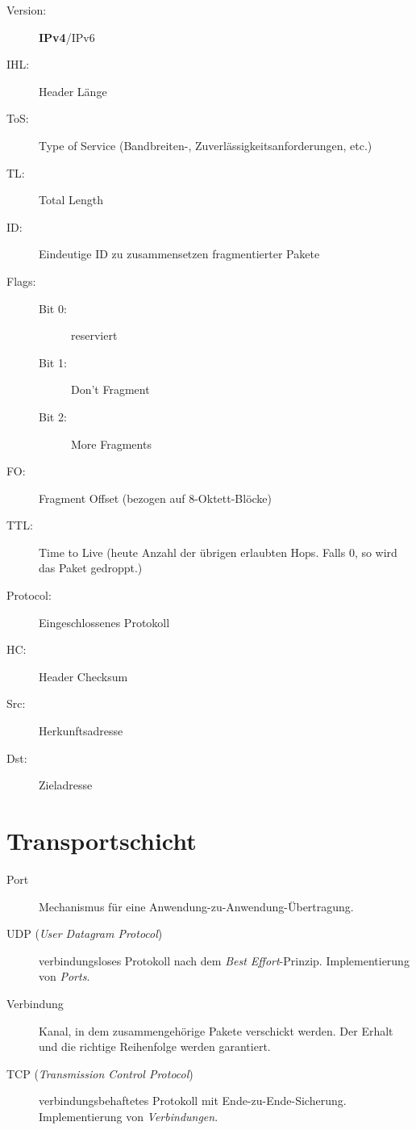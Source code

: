 \documentclass[a4paper]{article}
\begin{document}
\vspace{5mm}
\begin{minipage}{0.45\textwidth}
    \begin{description}
        \item[Version:] \textbf{IPv4}/IPv6
        \item[IHL:] Header Länge
        \item[ToS:] Type of Service (Bandbreiten-, Zuverlässigkeitsanforderungen, etc.)
        \item[TL:] Total Length
        \item[ID:] Eindeutige ID zu zusammensetzen fragmentierter Pakete
        \item[Flags:]\hfill
        \begin{description}
            \item[Bit 0:] reserviert
            \item[Bit 1:] Don't Fragment
            \item[Bit 2:] More Fragments
        \end{description}
    \end{description}
\end{minipage}
\begin{minipage}{0.1\textwidth}
\end{minipage}
\begin{minipage}{0.45\textwidth}
    \begin{description}
        \item[FO:] Fragment Offset (bezogen auf 8-Oktett-Blöcke)
        \item[TTL:] Time to Live (heute Anzahl der übrigen erlaubten Hops. Falls 0, so wird das Paket gedroppt.)
        \item[Protocol:] Eingeschlossenes Protokoll
        \item[HC:] Header Checksum
        \item[Src:] Herkunftsadresse
        \item[Dst:] Zieladresse
    \end{description}
\end{minipage}

\section{Transportschicht}

\begin{description}
    \item[Port] Mechanismus für eine Anwendung-zu-Anwendung-Übertragung.
    \item[UDP (\textit{User Datagram Protocol})] verbindungsloses Protokoll nach dem \textit{Best Effort}-Prinzip. Implementierung von \textit{Ports}.
    \item[Verbindung] Kanal, in dem zusammengehörige Pakete verschickt werden. Der Erhalt und die richtige Reihenfolge werden garantiert.
    \item[TCP (\textit{Transmission Control Protocol})] verbindungsbehaftetes Protokoll mit Ende-zu-Ende-Sicherung. Implementierung von \textit{Verbindungen}.
\end{description}
\end{document}
